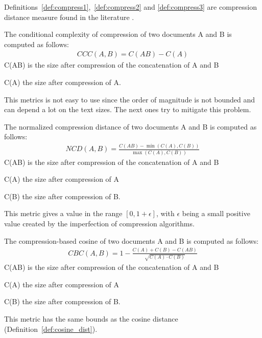 Definitions~\ref{def:compress1},~\ref{def:compress2} and \ref{def:compress3} are compression distance measure found in the literature  \cite{comparing_compression} \cite{savoy_stylo}.

\begin{definition}
  The conditional complexity of compression of two documents A and B is computed as follows:
  \begin{gather*}
    CCC(A, B) = C(AB) - C(A)
  \end{gather*}
  C(AB) is the size after compression of the concatenation of A and B

  C(A) the size after compression of A.

  This metrics is not easy to use since the order of magnitude is not bounded and can depend a lot on the text sizes.
  The next ones try to mitigate this problem.
\end{definition}

\begin{definition}
  The normalized compression distance of two documents A and B is computed as follows:
  \begin{gather*}
    NCD(A, B) = \frac{C(AB) - \min(C(A), C(B))}{\max(C(A), C(B))}
  \end{gather*}
  C(AB) is the size after compression of the concatenation of A and B

  C(A) the size after compression of A

  C(B) the size after compression of B.

  This metric gives a value in the range $\left[0, 1+\epsilon\right]$, with $\epsilon$ being a small positive value created by the imperfection of compression algorithms.
\end{definition}

\begin{definition}
  The compression-based cosine of two documents A and B is computed as follows:
  \begin{gather*}
    CBC(A, B) = 1 - \frac{C(A) + C(B) - C(AB)}{\sqrt{C(A) \cdot C(B)}}
  \end{gather*}
  C(AB) is the size after compression of the concatenation of A and B

  C(A) the size after compression of A

  C(B) the size after compression of B.

  This metric has the same bounds as the cosine distance (Definition~\ref{def:cosine_dist}).
\end{definition}


